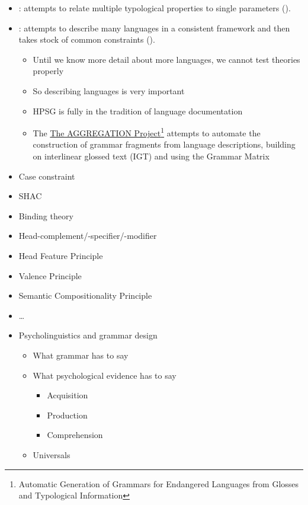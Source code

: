 \documentclass[a4paper,landscape,headrule,footrule]{foils}
\begin{document}

\begin{itemize}
\item {}: attempts to relate multiple 
typological properties to single parameters ().
\item {}: attempts to 
describe many languages in a consistent 
framework and then takes stock of common 
constraints ().
\begin{itemize}
\item Until we know more detail about more languages, we cannot test theories properly
\item So describing languages  is very important
\item HPSG is fully in the tradition of language documentation
\item The \href{http://depts.washington.edu/uwcl/aggregation/}{The
    AGGREGATION Project}\footnote{Automatic Generation of Grammars for
    Endangered Languages from Glosses and Typological Information}
  attempts to automate the construction of grammar fragments from
  language descriptions, building on interlinear glossed text (IGT)
  and using the Grammar Matrix
\end{itemize}
\end{itemize}

\begin{itemize}
\item Case constraint
\item SHAC
\item Binding theory
\item Head-complement/-specifier/-modifier
\item Head Feature Principle
\item Valence Principle
\item Semantic Compositionality Principle
\item \ldots{}
\end{itemize}

\begin{itemize}
\item Psycholinguistics and grammar design
  \begin{itemize}
  \item What grammar has to say
  \item What psychological evidence has to say
    \begin{itemize}
    \item Acquisition
    \item Production
    \item Comprehension
    \end{itemize}
  \item Universals
  \end{itemize}
\end{itemize}
\end{document}
